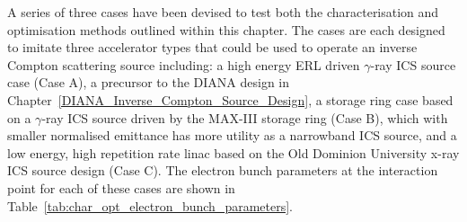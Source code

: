\documentclass[../main.tex]{subfiles}
\begin{document}
A series of three cases have been devised to test both the characterisation and optimisation methods outlined within this chapter. The cases are each designed to imitate three accelerator types that could be used to operate an inverse Compton scattering source including: a high energy ERL driven $\gamma$-ray ICS source case (Case A), a precursor to the DIANA design in Chapter~\ref{DIANA_Inverse_Compton_Source_Design}, a storage ring case based on a $\gamma$-ray ICS source driven by the MAX-III storage ring  \cite{owen2013nonequilibrium} (Case B), which with smaller normalised emittance has more utility as a narrowband ICS source, and a low energy, high repetition rate linac based on the Old Dominion University x-ray ICS source design \cite{krafft2016laser,deitrick2017inverse,deitrick2018high} (Case C). The electron bunch parameters at the interaction point for each of these cases are shown in Table~\ref{tab:char_opt_electron_bunch_parameters}.
\end{document}
